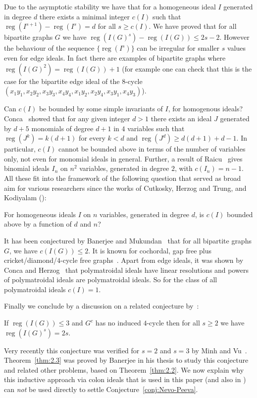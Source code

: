 \documentclass[ALCO,published]{cedram}
\numberwithin{equation}{section}
\newcommand \reg{\operatorname{reg}}
\begin{document}
 Due to the asymptotic stability we have that for a homogeneous ideal $I$ generated in degree $d$ there exists a minimal integer $c(I)$ such that $\reg(I^{s+1})-\reg(I^s)=d$ for all $s\geq c(I)$. 
 We have proved that for all bipartite graphs $G$ we have $\reg(I(G)^s)- \reg(I(G)) \leq 2s-2$. 
 However the behaviour of the sequence $\{\reg(I^s)\}$ can be irregular for smaller $s$ values even for edge ideals. In fact there are examples of bipartite graphs where $\reg(I(G)^2)=\reg(I(G)) +1$ (for example one can check that this is the case for the bipartite edge ideal of the 8-cycle  $(x_1y_1,x_2y_2,x_3y_3,x_4y_4,x_1y_2,x_2y_4,x_3y_1,x_4y_3)$).

 Can $c(I)$ be bounded by some simple invariants of $I$, for homogenous ideals?
  Conca~\cite{Conca} showed that for any given integer $d > 1$ there exists an ideal $J$ generated by $d+5$ monomials of degree $d + 1$ in $4$ variables such that $\reg(J^k) = k(d + 1)$ for every $k <d$ and $\reg(J^d) \geq d(d + 1) + d-1$. In particular, $c(I)$ cannot be bounded above in terms of the number of variables only, not even for monomial ideals in general. Further, a result of Raicu~\cite{Raicu} gives binomial ideals $I_n$ on $n^2$ variables, generated in degree $2$, with $c(I_n)=n-1$. All these fit into the framework of the following question that served as broad aim for various researchers
since the works of Cutkosky, Herzog and Trung, and Kodiyalam (\cite{BBH17,Conca,CH03,CHT, huneke,ha_adam2,HHZ, JS18,vijay,Nevo, nevo_peeva}):

\begin{question}
For homogeneous ideals $I$ on $n$ variables, generated in degree $d$, is $c(I)$ bounded above by a function of $d$ and $n$?
\end{question}

 It has been conjectured by Banerjee and Mukundan~\cite{arindam_vivek} that for all bipartite graphs $G$, we have $c(I(G)) \leq 2$. 
 It is known  for cochordal, gap free plus cricket/diamond/$4$-cycle free graphs~\cite{banerjee,HHZ,Er1,Er2}. Apart from edge ideals, it was shown by Conca and Herzog~\cite{CH03} that polymatroidal ideals have linear resolutions and powers of polymatroidal ideals are polymatroidal ideals. So for the class of all polymatroidal ideals $c(I)=1$.

Finally we conclude by a discussion on a related conjecture by~\cite{nevo_peeva}:

\begin{conj}\label{conj:Nevo-Peeva}
If $\reg(I(G)) \leq 3$ and $G^c$ has no induced $4$-cycle then for all $s \geq 2$ we have $\reg (I(G)^s) =2s$.
\end{conj}
Very recently this conjecture was verified for $s=2$ and $s=3$ by Minh and Vu~\cite{minh_vu2}.
 Theorem~\ref{thm:2.3} was proved by Banerjee in his thesis to study this conjecture and related other problems, based on Theorem~\ref{thm:2.2}.
We now explain why this inductive approach via colon ideals that is used in this paper (and also in \cite{banerjee1,banerjee,BBH17,Nevo,nevo_peeva,jayanthan,JS18}) can \emph{not} be used directly to settle Conjecture~\ref{conj:Nevo-Peeva}.
\end{document}
